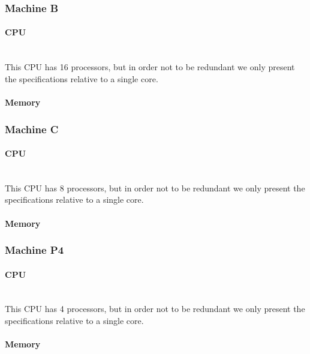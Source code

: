 \subsubsection{Machine B}
\paragraph{CPU}\mbox{}\\
This CPU has 16 processors, but in order not to be redundant we only present the specifications relative to a single core.
{\fontsize{9}{10}\selectfont }
\paragraph{Memory}
{\fontsize{9}{10}\selectfont }

\subsubsection{Machine C}
\paragraph{CPU}\mbox{}\\
This CPU has 8 processors, but in order not to be redundant we only present the specifications relative to a single core.
{\fontsize{9}{10}\selectfont }
\paragraph{Memory}
{\fontsize{9}{10}\selectfont }

\subsubsection{Machine P4}
\paragraph{CPU}\mbox{}\\
This CPU has 4 processors, but in order not to be redundant we only present the specifications relative to a single core.
{\fontsize{9}{10}\selectfont }
\paragraph{Memory}
{\fontsize{9}{10}\selectfont }

